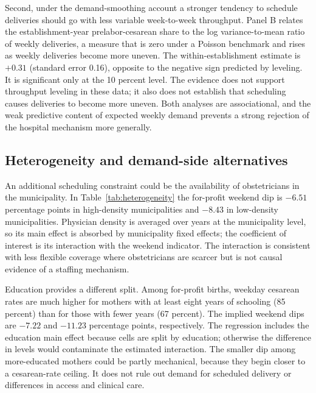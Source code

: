Second, under the demand-smoothing account a stronger tendency to schedule
deliveries should go with less variable week-to-week throughput. Panel B relates
the establishment-year prelabor-cesarean share to the log variance-to-mean ratio of
weekly deliveries, a measure that is zero under a Poisson benchmark and rises as
weekly deliveries become more uneven. The within-establishment estimate is $+0.31$
(standard error 0.16), opposite to the negative sign predicted by leveling. It is
significant only at the 10 percent level. The evidence does not support throughput
leveling in these data; it also does not establish that scheduling causes
deliveries to become more uneven. Both analyses are associational, and the weak
predictive content of expected weekly demand prevents a strong rejection of the
hospital mechanism more generally.



\subsection{Heterogeneity and demand-side alternatives}

An additional scheduling constraint could be the availability of obstetricians in
the municipality. In Table~\ref{tab:heterogeneity} the for-profit weekend dip is
$-6.51$ percentage points in high-density municipalities and $-8.43$ in
low-density municipalities. Physician density is averaged over years at the
municipality level, so its main effect is absorbed by municipality fixed effects;
the coefficient of interest is its interaction with the weekend indicator. The
interaction is consistent with less flexible coverage where obstetricians are
scarcer but is not causal evidence of a staffing mechanism.

Education provides a different split. Among for-profit births, weekday cesarean
rates are much higher for mothers with at least eight years of schooling (85
percent) than for those with fewer years (67 percent). The implied weekend dips
are $-7.22$ and $-11.23$ percentage points, respectively. The regression includes
the education main effect because cells are split by education; otherwise the
difference in levels would contaminate the estimated interaction. The smaller dip
among more-educated mothers could be partly mechanical, because they begin closer
to a cesarean-rate ceiling. It does not rule out demand for scheduled delivery or
differences in access and clinical care.

